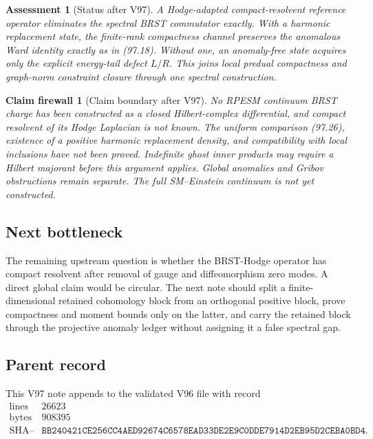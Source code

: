 \documentclass[11pt]{article}
\newtheorem{firewall}[theorem]{Claim firewall}
\newtheorem{assessment}[theorem]{Assessment}
\theoremstyle{remark}
\begin{document}
\begin{assessment}[Status after V97]
\label{ass:v12v97-status}
A Hodge-adapted compact-resolvent reference operator eliminates the
spectral BRST commutator exactly.  With a harmonic replacement state,
the finite-rank compactness channel preserves the anomalous Ward
identity exactly as in (97.18).  Without one, an anomaly-free state
acquires only the explicit energy-tail defect \(L/R\).  This joins
local predual compactness and graph-norm constraint closure through
one spectral construction.
\end{assessment}

\begin{firewall}[Claim boundary after V97]
\label{fire:v12v97-claim}
No RPESM continuum BRST charge has been constructed as a closed
Hilbert-complex differential, and compact resolvent of its Hodge
Laplacian is not known.  The uniform comparison (97.26), existence
of a positive harmonic replacement density, and compatibility with
local inclusions have not been proved.  Indefinite ghost inner
products may require a Hilbert majorant before this argument
applies.  Global anomalies and Gribov obstructions remain separate.
The full SM--Einstein continuum is not yet constructed.
\end{firewall}

\subsection{Next bottleneck}

The remaining upstream question is whether the BRST-Hodge operator
has compact resolvent after removal of gauge and diffeomorphism zero
modes.  A direct global claim would be circular.  The next note
should split a finite-dimensional retained cohomology block from an
orthogonal positive block, prove compactness and moment bounds only
on the latter, and carry the retained block through the projective
anomaly ledger without assigning it a false spectral gap.

\subsection{Parent record}

This V97 note appends to the validated V96 file with record
\[
\begin{array}{c|c}
\text{lines}&26623\\
\text{bytes}&908395\\
\text{SHA--256}&
\texttt{BB240421CE256CC4AED92674C6578EAD33DE2E9C0DDE7914D2EB95D2CEBA0BD4}.
\end{array}
\]
\end{document}
